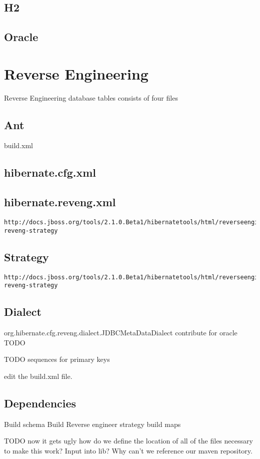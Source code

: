 \documentclass[a4paper,10pt]{book}
\begin{document}
\section{H2}
\section{Oracle}
\chapter{Reverse Engineering}
Reverse Engineering database tables consists of four files
\section{Ant}
build.xml
\section{hibernate.cfg.xml}
\section{hibernate.reveng.xml}
\begin{verbatim}
http://docs.jboss.org/tools/2.1.0.Beta1/hibernatetools/html/reverseengineering.html#custom-reveng-strategy
\end{verbatim}
\section{Strategy}
\begin{verbatim}
http://docs.jboss.org/tools/2.1.0.Beta1/hibernatetools/html/reverseengineering.html#custom-reveng-strategy
\end{verbatim}
\section{Dialect} 
 org.hibernate.cfg.reveng.dialect.JDBCMetaDataDialect  contribute for oracle TODO

TODO sequences for primary keys

edit the build.xml file.

\section{Dependencies}
Build schema
Build Reverse engineer strategy
build maps

TODO now it gets ugly how do we define the location of all of the files necessary to make this work? Input into lib?  
Why can't we reference our maven repository.
\end{document}
